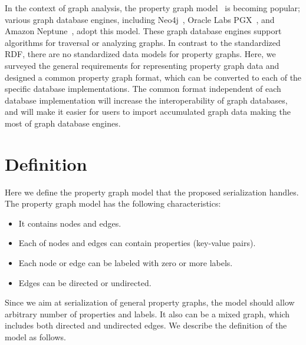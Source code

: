 \documentclass[runningheads]{llncs}
\begin{document}
In the context of graph analysis, the property graph model~\cite{angles} is becoming popular; various graph database engines, including Neo4j~\cite{neo4j}, Oracle Labs PGX~\cite{pgx}, and Amazon Neptune~\cite{neptune}, adopt this model. These graph database engines support algorithms for traversal or analyzing graphs. 
In contrast to the standardized RDF, there are no standardized data models for property graphs.
Here, we surveyed the general requirements for representing property graph data and designed a common property graph format, which can be converted to each of the specific database implementations. The common format independent of each database implementation will increase the interoperability of graph databases, and will make it easier for users to import accumulated graph data making the most of graph database engines.

\section{Definition}
Here we define the property graph model that the proposed serialization handles.
The property graph model has the following characteristics:

\begin{itemize}
    \item It contains nodes and edges.
    \item Each of nodes and edges can contain properties (key-value pairs).
    \item Each node or edge can be labeled with zero or more labels.
    \item Edges can be directed or undirected.
\end{itemize}

Since we aim at serialization of general property graphs, the model should allow arbitrary number of properties and labels. It also can be a mixed graph, which includes both directed and undirected edges.
We describe the definition of the model as follows.
\end{document}
